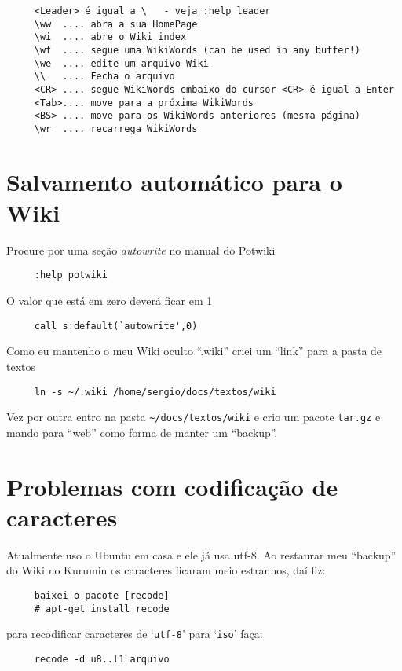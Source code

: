 \begin{verbatim}
     <Leader> é igual a \   - veja :help leader
     \ww  .... abra a sua HomePage
     \wi  .... abre o Wiki index
     \wf  .... segue uma WikiWords (can be used in any buffer!)
     \we  .... edite um arquivo Wiki
     \\   .... Fecha o arquivo
     <CR> .... segue WikiWords embaixo do cursor <CR> é igual a Enter
     <Tab>.... move para a próxima WikiWords
     <BS> .... move para os WikiWords anteriores (mesma página)
     \wr  .... recarrega WikiWords
\end{verbatim}

\section{Salvamento automático para o Wiki }
\label{Salvamento automático para o Wiki }
Procure por uma seção {\em autowrite} no manual do Potwiki

\begin{verbatim}
     :help potwiki
\end{verbatim}

O valor que está em zero deverá ficar em 1

\begin{verbatim}
     call s:default(`autowrite',0)
\end{verbatim}

{\Large {}} Como eu mantenho o meu Wiki oculto ``.wiki'' criei um
``link'' para a pasta de textos

\begin{verbatim}
     ln -s ~/.wiki /home/sergio/docs/textos/wiki
\end{verbatim}

Vez por outra entro na pasta \verb|~/docs/textos/wiki| e crio um
pacote {\tt tar.gz} e mando para ``web'' como forma de manter um ``backup''.

\section{Problemas com codificação de caracteres}
\label{Problemas com codificação de caracteres}

Atualmente uso o Ubuntu em casa e ele já usa utf-8. Ao restaurar meu
``backup'' do Wiki no Kurumin os caracteres ficaram meio estranhos,
daí fiz:

\begin{verbatim}
     baixei o pacote [recode]
     # apt-get install recode
\end{verbatim}
para recodificar caracteres de `\texttt{utf-8}' para `\texttt{iso}' faça:
\begin{verbatim}
     recode -d u8..l1 arquivo
\end{verbatim}
